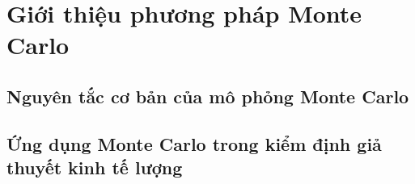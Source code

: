 \chapter{Giới thiệu phương pháp Monte Carlo}
\section{Nguyên tắc cơ bản của mô phỏng Monte Carlo}
\section{Ứng dụng Monte Carlo trong kiểm định giả thuyết kinh tế lượng}